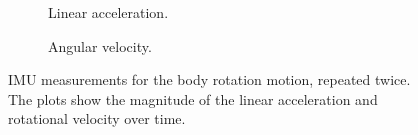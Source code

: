 \documentclass[fleqn,10pt]{wlscirep}
\begin{document}
\begin{figure}[h!]
    \centering
    \begin{subfigure}{0.99\linewidth}
        \centering
        
        \vspace{-2.5 em}
        \caption{Linear acceleration.}
        \label{fig:imu_body_linear}
    \end{subfigure}

    \begin{subfigure}{0.99\linewidth}
        \centering
        \vspace{1 em}
        
        \vspace{-2.5 em}
        \caption{Angular velocity.}
        \label{fig:imu_body_angular}
    \end{subfigure}
    \caption{IMU measurements for the body rotation motion, repeated twice. The plots show the magnitude of the linear acceleration and rotational velocity over time.}
    \label{fig:imu_body_rotation}
\end{figure}
\end{document}
